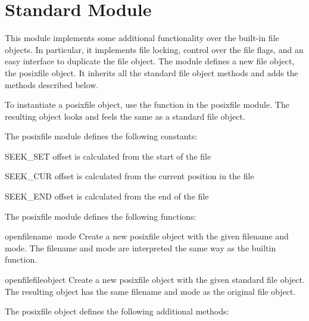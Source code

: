 \section{Standard Module }

This module implements some additional functionality over the built-in
file objects.  In particular, it implements file locking, control over
the file flags, and an easy interface to duplicate the file object.
The module defines a new file object, the posixfile object.  It
inherits all the standard file object methods and adds the methods
described below.

To instantiate a posixfile object, use the  function in
the posixfile module.  The resulting object looks and feels the same as
a standard file object.

The posixfile module defines the following constants:

\renewcommand{\indexsubitem}{(in module posixfile)}
\begin{datadesc}{SEEK_SET}
offset is calculated from the start of the file
\end{datadesc}

\begin{datadesc}{SEEK_CUR}
offset is calculated from the current position in the file
\end{datadesc}

\begin{datadesc}{SEEK_END}
offset is calculated from the end of the file
\end{datadesc}

The posixfile module defines the following functions:

\renewcommand{\indexsubitem}{(in module posixfile)}
\begin{funcdesc}{open}{filename\, mode}
 Create a new posixfile object with the given filename and mode.  The
 filename and mode are interpreted the same way as the 
 builtin function.
\end{funcdesc}

\begin{funcdesc}{openfile}{fileobject}
 Create a new posixfile object with the given standard file object.
 The resulting object has the same filename and mode as the original
 file object.
\end{funcdesc}

The posixfile object defines the following additional methods:

